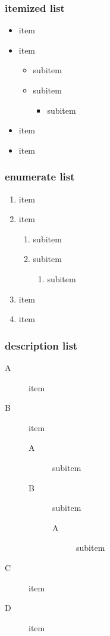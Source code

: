 \begin{frame}
\frametitle{itemized list}
\begin{itemize}
\item item
\item item
    \begin{itemize}
    \item subitem
    \item subitem
        \begin{itemize}
        \item subitem
        \end{itemize}
    \end{itemize}
\item item
\item item
\end{itemize}
\end{frame}

\begin{frame}
\frametitle{enumerate list}
\begin{enumerate}
\item item
\item item
    \begin{enumerate}
    \item subitem
    \item subitem
        \begin{enumerate}
        \item subitem
        \end{enumerate}
    \end{enumerate}
\item item
\item item
\end{enumerate}
\end{frame}

\begin{frame}
\frametitle{description list}
\begin{description}
\item[A] item
\item[B] item
    \begin{description}
    \item[A] subitem
    \item[B] subitem
        \begin{description}
        \item[A] subitem
        \end{description}
    \end{description}
\item[C] item
\item[D] item
\end{description}
\end{frame}

